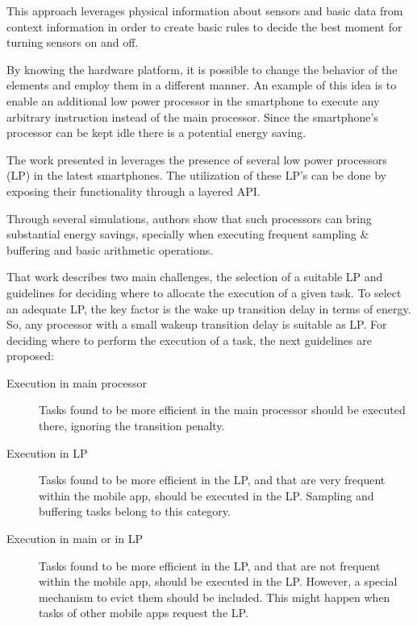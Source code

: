 This approach leverages physical information about sensors and basic data from context information in order to create basic rules to decide the best moment for turning sensors on and off.


By knowing the hardware platform, it is possible to change the behavior of the elements and employ them in a different manner.
An example of this idea is to enable an additional low power processor in the smartphone to execute any arbitrary instruction instead of the main processor.
Since the smartphone's processor can be kept idle there is a potential energy saving.

The work presented in \cite{Ra2012} leverages the presence of several low power processors (LP) in the latest smartphones.
The utilization of these LP's can be done by exposing their functionality through a layered API.

Through several simulations, authors show that such processors can bring substantial energy savings, specially when executing frequent sampling \& buffering and basic arithmetic operations.

That work describes two main challenges, the selection of a suitable LP and guidelines for deciding where to allocate the execution of a given task.
To select an adequate LP, the key factor is the wake up transition delay in terms of energy. So, any processor with a small wakeup transition delay is suitable as LP.
For deciding where to perform the execution of a task, the next guidelines are proposed:
\begin{description}
  \item[Execution in main processor]{Tasks found to be more efficient in the main processor should be executed there, ignoring the transition penalty}.
  \item[Execution in LP]{Tasks found to be more efficient in the LP, and that are very frequent within the mobile app, should be executed in the LP. Sampling and buffering tasks belong to this category}.
  \item[Execution in main or in LP]{Tasks found to be more efficient in the LP, and  that are not frequent within the mobile app, should be executed in the LP. However, a special mechanism to evict them should be included. This might happen when tasks of other mobile apps request the LP}.
\end{description}
